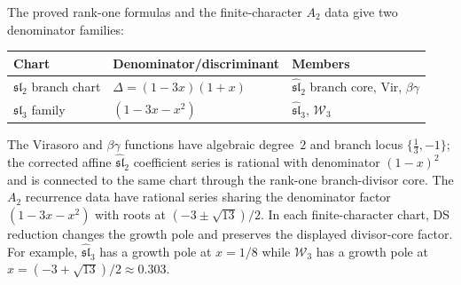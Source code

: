 \begin{remark}\label{rem:two-discriminant-families}
The proved rank-one formulas and the finite-character $A_2$ data give
two denominator families:
\begin{center}
\renewcommand{\arraystretch}{1.3}
\begin{tabular}{lll}
\toprule
\textbf{Chart} & \textbf{Denominator/discriminant}
 & \textbf{Members} \\
\midrule
$\mathfrak{sl}_2$ branch chart &
 $\Delta = (1-3x)(1+x)$ &
 $\widehat{\mathfrak{sl}}_2$ branch core, $\mathrm{Vir}$, $\beta\gamma$ \\
$\mathfrak{sl}_3$ family &
 $(1-3x-x^2)$ &
 $\widehat{\mathfrak{sl}}_3$, $\mathcal{W}_3$ \\
\bottomrule
\end{tabular}
\end{center}
The Virasoro and $\beta\gamma$ functions have algebraic degree~$2$
and branch locus $\{\tfrac{1}{3}, -1\}$; the corrected affine
$\widehat{\mathfrak{sl}}_2$ coefficient series is rational with
denominator $(1-x)^2$ and is connected to the same chart through the
rank-one branch-divisor core.  The $A_2$ recurrence data have rational
series sharing the denominator factor $(1-3x-x^2)$ with roots at
$(-3 \pm \sqrt{13})/2$.
In each finite-character chart, DS reduction changes the growth pole
and preserves the displayed divisor-core factor.
For example, $\widehat{\mathfrak{sl}}_3$ has a
growth pole at $x = 1/8$ while $\mathcal{W}_3$ has a
growth pole at $x = (-3+\sqrt{13})/2 \approx 0.303$.
\end{remark}

